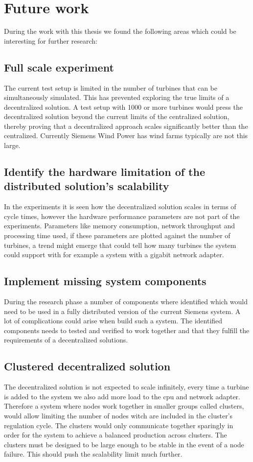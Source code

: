 \chapter{Future work}
\label{sec:futWork}
During the work with this thesis we found the following areas which could be interesting for further research:

\section{Full scale experiment}
The current test setup is limited in the number of turbines that can be simultaneously simulated. This has prevented exploring the true limits of a decentralized solution.
A test setup with 1000 or more turbines would press the decentralized solution beyond the current limits of the centralized solution, thereby proving that a decentralized approach scales significantly better than the centralized. Currently Siemens Wind Power has wind farms typically are not this large\cite{simensOnShoreProjects,simensOffShoreProjects}. 


\section{Identify the hardware limitation of the distributed solution's scalability}
In the experiments it is seen how the decentralized solution scales in terms of cycle times, however the hardware performance parameters are not part of the experiments.
Parameters like memory consumption, network throughput and processing time used, if these parameters are plotted against the number of turbines, a trend might emerge that could tell how many turbines the system could support with for example a system with a gigabit network adapter.


\section{Implement missing system components}
During the research phase a number of components where identified which would need to be used in a fully distributed version of the current Siemens system.
A lot of complications could arise when build such a system. The identified components needs to tested and verified to work together and that they fulfill the requirements of a decentralized solutions. 


\section{Clustered decentralized solution}
The decentralized solution is not expected to scale infinitely, every time a turbine is added to the system we also add more load to the cpu and network adapter.
Therefore a system where nodes work together in smaller groups called clusters, would allow limiting the number of nodes witch are included in the cluster's regulation cycle. 
The clusters would only communicate together sparingly in order for the system to achieve a balanced production across clusters.
The clusters must be designed to be large enough to be stable in the event of a node failure.
This should push the scalability limit much further.


